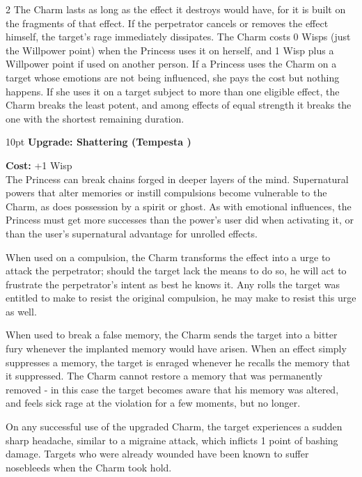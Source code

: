 \begin{multicols}{2}
The Charm lasts as long as the effect it destroys would have, for it is built on the fragments of that effect. If the perpetrator cancels or removes the effect himself, the target's rage immediately dissipates. The Charm costs 0 Wisps (just the Willpower point) when the Princess uses it on herself, and 1 Wisp plus a Willpower point if used on another person. If a Princess uses the Charm on a target whose emotions are not being influenced, she pays the cost but nothing happens. If she uses it on a target subject to more than one eligible effect, the Charm breaks the least potent, and among effects of equal strength it breaks the one with the shortest remaining duration.

\begin{myindentpar}{10pt} \textbf{Upgrade: Shattering (Tempesta \textbullet\textbullet\textbullet\textbullet)}

\noindent \textbf{Cost:} +1 Wisp \\

\noindent The Princess can break chains forged in deeper layers of the mind. Supernatural powers that alter memories or instill compulsions become vulnerable to the Charm, as does possession by a spirit or ghost. As with emotional influences, the Princess must get more successes than the power's user did when activating it, or than the user's supernatural advantage for unrolled effects.

When used on a compulsion, the Charm transforms the effect into a urge to attack the perpetrator; should the target lack the means to do so, he will act to frustrate the perpetrator's intent as best he knows it. Any rolls the target was entitled to make to resist the original compulsion, he may make to resist this urge as well. 

When used to break a false memory, the Charm sends the target into a bitter fury whenever the implanted memory would have arisen. When an effect simply suppresses a memory, the target is enraged whenever he recalls the memory that it suppressed. The Charm cannot restore a memory that was permanently removed - in this case the target becomes aware that his memory was altered, and feels sick rage at the violation for a few moments, but no longer.

On any successful use of the upgraded Charm, the target experiences a sudden sharp headache, similar to a migraine attack, which inflicts 1 point of bashing damage. Targets who were already wounded have been known to suffer nosebleeds when the Charm took hold.\end{myindentpar}


\end{multicols}
